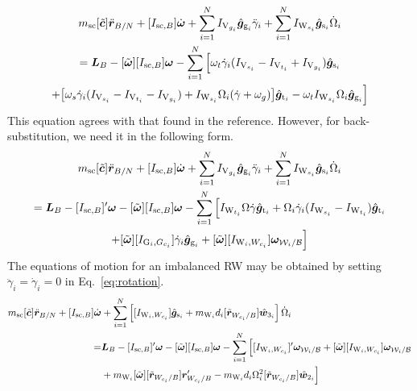 \begin{multline}
m_{\text{\text{sc}}}[\tilde{\bm{c}}]\ddot{\bm r}_{B/N} + [I_{\text{sc},B}]\dot{\bm\omega}
+\sum\limits_{i=1}^{N}I_{\text{V}_{g_i}}\hat{\bm{g}}_{\text{g}_i} \ddot{\gamma}_i
+\sum\limits_{i=1}^{N}I_{\text{W}_{s_i}}\hat{\bm{g}}_{\text{s}_i} \dot{\Omega}_i
\\
= \bm{L}_B - [\tilde{\bm\omega}][I_{\text{sc},B}]\bm\omega
-\sum\limits_{i=1}^{N} \Big[ 
\omega_t\dot{\gamma}_i(I_{\text{V}_{s_i}}-I_{\text{V}_{t_i}}+I_{\text{V}_{g_i}}) \hat{\bm{g}}_{\text{s}_i}
\\+ \big[ \omega_s\dot{\gamma}_i(I_{\text{V}_{s_i}}-I_{\text{V}_{t_i}}-I_{\text{V}_{g_i}}) + I_{\text{W}_{s_i}}\Omega_i(\dot{\gamma} + \omega_g) \big]\hat{\bm{g}}_{\text{t}_i}
-\omega_tI_{\text{W}_{s_i}}\Omega_i\hat{\bm{g}}_{\text{g}_i} \Big]
\label{eq:vscmgRotationSimple}
\end{multline}
This equation agrees with that found in the reference. However, for back-substitution, we need it in the following form.
\begin{multline}
m_{\text{\text{sc}}}[\tilde{\bm{c}}]\ddot{\bm r}_{B/N} + [I_{\text{sc},B}]\dot{\bm\omega}
+\sum\limits_{i=1}^{N}I_{\text{V}_{g_i}}\hat{\bm{g}}_{\text{g}_i} \ddot{\gamma}_i
+\sum\limits_{i=1}^{N}I_{\text{W}_{s_i}}\hat{\bm{g}}_{\text{s}_i} \dot{\Omega}_i
\\
= \bm{L}_B - [I_{\text{sc},B}]'\bm{\omega} - [\tilde{\bm\omega}][I_{\text{sc},B}]\bm\omega
-\sum\limits_{i=1}^{N} \Big[ 
I_{\text{W}_{t_i}}\Omega\dot{\gamma}\hat{\bm{g}}_{\text{t}_i} + \Omega_i\dot{\gamma}_i(I_{\text{W}_{s_i}}-I_{\text{W}_{t_i}})\hat{\bm{g}}_{\text{t}_i} \\+ [\tilde{\bm\omega}][I_{\text{G}_i,G_{c_i}}]\dot{\gamma}_i\hat{\bm{g}}_{\text{g}_i} + [\tilde{\bm{\omega}}][I_{\text{W}_i,W_{c_i}}]\bm{\omega}_{\mathcal{W}_i/\cal B}
\Big]
\label{eq:rotationsimpleBS}
\end{multline}
The equations of motion for an imbalanced RW may be obtained by setting $\ddot{\gamma}_i = \dot{\gamma}_i = 0$ in Eq.~\eqref{eq:rotation}.
\begin{equation}
	\begin{split}
		m_{\text{\text{sc}}}[\tilde{\bm{c}}]\ddot{\bm r}_{B/N} + [I_{\text{sc},B}]\dot{\bm\omega}&
		+\sum\limits_{i=1}^{N} \left[ [I_{\text{W}_i,W_{c_i}}]\hat{\bm{g}}_{\text{s}_i} + m_{\text{W}_i}d_i[\tilde{\bm{r}}_{W_{c_i}/B}]\hat{\bm w}_{3_i} \right] \dot{\Omega}_i
		\\
		=& \bm{L}_B - [I_{\text{sc},B}]'\bm{\omega} - [\tilde{\bm\omega}][I_{\text{sc},B}]\bm\omega
		-\sum\limits_{i=1}^{N} \Big[ 
		[I_{\text{W}_i,W_{c_i}}]'\bm{\omega}_{\mathcal{W}_i/\cal B} + [\tilde{\bm{\omega}}][I_{\text{W}_i,W_{c_i}}]\bm{\omega}_{\mathcal{W}_i/\cal B} \\&+ m_{\text{W}_i}[\tilde{\bm{\omega}}][\tilde{\bm{r}}_{W_{c_i}/B}]\bm{r}'_{W_{c_i}/B} - m_{\text{W}_i}d_i\Omega_i^2[\tilde{\bm{r}}_{W_{c_i}/B}]\hat{\bm{w}}_{2_i}
		\Big]
	\end{split}
	\label{eq:rotation_rw}
\end{equation}
